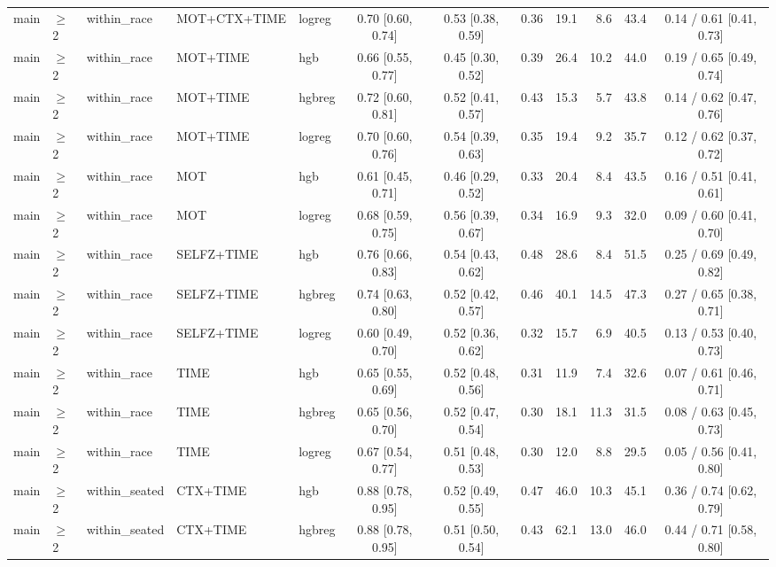 \begin{longtable}{@{}lllllcccrrrc@{}}
main & $\geq$2 & within\_race & MOT+CTX+TIME & logreg & 0.70 [0.60, 0.74] & 0.53 [0.38, 0.59] & 0.36 & 19.1 & 8.6 & 43.4 & 0.14 / 0.61 [0.41, 0.73] \\
main & $\geq$2 & within\_race & MOT+TIME & hgb & 0.66 [0.55, 0.77] & 0.45 [0.30, 0.52] & 0.39 & 26.4 & 10.2 & 44.0 & 0.19 / 0.65 [0.49, 0.74] \\
main & $\geq$2 & within\_race & MOT+TIME & hgbreg & 0.72 [0.60, 0.81] & 0.52 [0.41, 0.57] & 0.43 & 15.3 & 5.7 & 43.8 & 0.14 / 0.62 [0.47, 0.76] \\
main & $\geq$2 & within\_race & MOT+TIME & logreg & 0.70 [0.60, 0.76] & 0.54 [0.39, 0.63] & 0.35 & 19.4 & 9.2 & 35.7 & 0.12 / 0.62 [0.37, 0.72] \\
main & $\geq$2 & within\_race & MOT & hgb & 0.61 [0.45, 0.71] & 0.46 [0.29, 0.52] & 0.33 & 20.4 & 8.4 & 43.5 & 0.16 / 0.51 [0.41, 0.61] \\
main & $\geq$2 & within\_race & MOT & logreg & 0.68 [0.59, 0.75] & 0.56 [0.39, 0.67] & 0.34 & 16.9 & 9.3 & 32.0 & 0.09 / 0.60 [0.41, 0.70] \\
main & $\geq$2 & within\_race & SELFZ+TIME & hgb & 0.76 [0.66, 0.83] & 0.54 [0.43, 0.62] & 0.48 & 28.6 & 8.4 & 51.5 & 0.25 / 0.69 [0.49, 0.82] \\
main & $\geq$2 & within\_race & SELFZ+TIME & hgbreg & 0.74 [0.63, 0.80] & 0.52 [0.42, 0.57] & 0.46 & 40.1 & 14.5 & 47.3 & 0.27 / 0.65 [0.38, 0.71] \\
main & $\geq$2 & within\_race & SELFZ+TIME & logreg & 0.60 [0.49, 0.70] & 0.52 [0.36, 0.62] & 0.32 & 15.7 & 6.9 & 40.5 & 0.13 / 0.53 [0.40, 0.73] \\
main & $\geq$2 & within\_race & TIME & hgb & 0.65 [0.55, 0.69] & 0.52 [0.48, 0.56] & 0.31 & 11.9 & 7.4 & 32.6 & 0.07 / 0.61 [0.46, 0.71] \\
main & $\geq$2 & within\_race & TIME & hgbreg & 0.65 [0.56, 0.70] & 0.52 [0.47, 0.54] & 0.30 & 18.1 & 11.3 & 31.5 & 0.08 / 0.63 [0.45, 0.73] \\
main & $\geq$2 & within\_race & TIME & logreg & 0.67 [0.54, 0.77] & 0.51 [0.48, 0.53] & 0.30 & 12.0 & 8.8 & 29.5 & 0.05 / 0.56 [0.41, 0.80] \\
main & $\geq$2 & within\_seated & CTX+TIME & hgb & 0.88 [0.78, 0.95] & 0.52 [0.49, 0.55] & 0.47 & 46.0 & 10.3 & 45.1 & 0.36 / 0.74 [0.62, 0.79] \\
main & $\geq$2 & within\_seated & CTX+TIME & hgbreg & 0.88 [0.78, 0.95] & 0.51 [0.50, 0.54] & 0.43 & 62.1 & 13.0 & 46.0 & 0.44 / 0.71 [0.58, 0.80] \\

\end{longtable}
